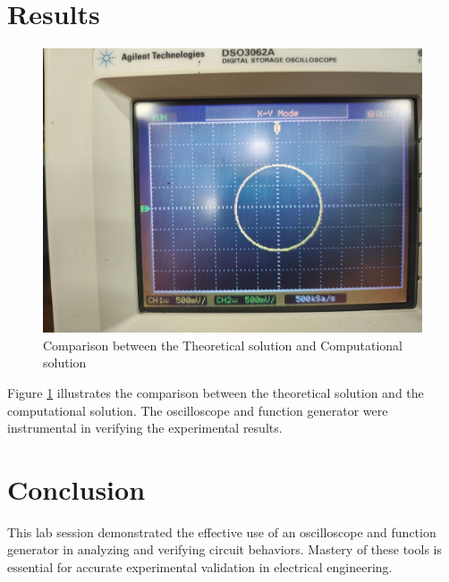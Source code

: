 \documentclass[journal]{IEEEtran}
\begin{document}
\section*{Results}
\begin{figure}[h!]
   \centering
   \includegraphics[width=\columnwidth]{figs/fig1.png}
   \caption{Comparison between the Theoretical solution and Computational solution}
   \label{stemplot}
\end{figure}

Figure \ref{stemplot} illustrates the comparison between the theoretical solution and the computational solution. The oscilloscope and function generator were instrumental in verifying the experimental results.

\section*{Conclusion}
This lab session demonstrated the effective use of an oscilloscope and function generator in analyzing and verifying circuit behaviors. Mastery of these tools is essential for accurate experimental validation in electrical engineering.
\end{document}
